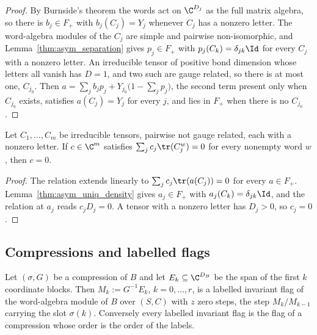 \begin{proof}
    \leanok
    By Burnside's theorem the words act on $\C^{D_j}$ as the full matrix algebra, so there is
    $b_j\in F_+$ with $b_j(C_j)=Y_j$ whenever $C_j$ has a nonzero letter. The word-algebra modules
    of the $C_j$ are simple and pairwise non-isomorphic, and Lemma~\ref{thm:asym_separation} gives
    $p_j\in F_+$ with $p_j(C_k)=\delta_{jk}\Id$ for every $C_j$ with a nonzero letter. An
    irreducible tensor of positive bond dimension whose letters all vanish has $D=1$, and two such
    are gauge related, so there is at most one, $C_{j_0}$. Then
    $a=\sum_jb_jp_j+Y_{j_0}\bigl(1-\sum_jp_j\bigr)$, the second term present only when $C_{j_0}$
    exists, satisfies $a(C_j)=Y_j$ for every $j$, and lies in $F_+$ when there is no $C_{j_0}$.
\end{proof}

\begin{lemma}
    \label{cor:asym_uniq_trace_independence}
    \leanok
    Let $C_1,\ldots,C_m$ be irreducible tensors, pairwise not gauge related, each with a nonzero
    letter. If $c\in\C^m$ satisfies $\sum_jc_j\tr(C_j^w)=0$ for every nonempty word $w$, then $c=0$.
\end{lemma}

\begin{proof}
    \leanok
    The relation extends linearly to $\sum_jc_j\tr(a(C_j))=0$ for every $a\in F_+$.
    Lemma~\ref{thm:asym_uniq_density} gives $a_j\in F_+$ with $a_j(C_k)=\delta_{jk}\Id$, and the
    relation at $a_j$ reads $c_jD_j=0$. A tensor with a nonzero letter has $D_j>0$, so $c_j=0$.
\end{proof}

\subsection{Compressions and labelled flags}

\begin{lemma}
    \label{prop:asym_uniq_dictionary}
    \leanok
    Let $(\sigma,G)$ be a compression of $B$ and let $E_k\subseteq\C^{D_B}$ be the span of the
    first $k$ coordinate blocks. Then $M_k:=G^{-1}E_k$, $k=0,\ldots,r$, is a labelled invariant flag
    of the word-algebra module of $B$ over $(S,C)$ with $z$ zero steps, the step $M_k/M_{k-1}$
    carrying the slot $\sigma(k)$. Conversely every labelled invariant flag is the flag of a
    compression whose order is the order of the labels.
\end{lemma}

